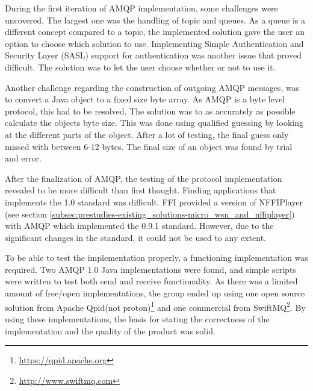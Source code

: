 During the first iteration of AMQP implementation, some challenges were uncovered. The largest one was the handling of topic and queues. As a queue is a different concept compared to a topic, the implemented solution gave the user an option to choose which solution to use. Implementing Simple Authentication and Security Layer (SASL) support for authentication was another issue that proved difficult. The solution was to let the user choose whether or not to use it.

Another challenge regarding the construction of outgoing AMQP messages, was to convert a Java object to a fixed size byte array. As AMQP is a byte level protocol, this had to be resolved. The solution was to as accurately as possible calculate the objects byte size. This was done using qualified guessing by looking at the different parts of the object. After a lot of testing, the final guess only missed with between 6-12 bytes. The final size of an object was found by trial and error.

After the finalization of AMQP, the testing of the protocol implementation revealed to be more difficult than first thought. Finding applications that implements the 1.0 standard was difficult. FFI provided a version of NFFIPlayer (see section \ref{subsec:prestudies-existing_solutions-micro_wsn_and_nffiplayer}) with AMQP which implemented the 0.9.1 standard. However, due to the significant changes in the standard, it could not be used to any extent.

To be able to test the implementation properly, a functioning implementation was required. Two AMQP 1.0 Java implementations were found, and simple scripts were written to test both send and receive functionality. As there was a limited amount of free/open implementations, the group ended up using one open source solution from Apache Qpid(not proton)\footnote{\url{https://qpid.apache.org}} and one commercial from SwiftMQ\footnote{\url{http://www.swiftmq.com}}. By using these implementations, the basis for stating the correctness of the implementation and the quality of the product was solid.

\clearpage